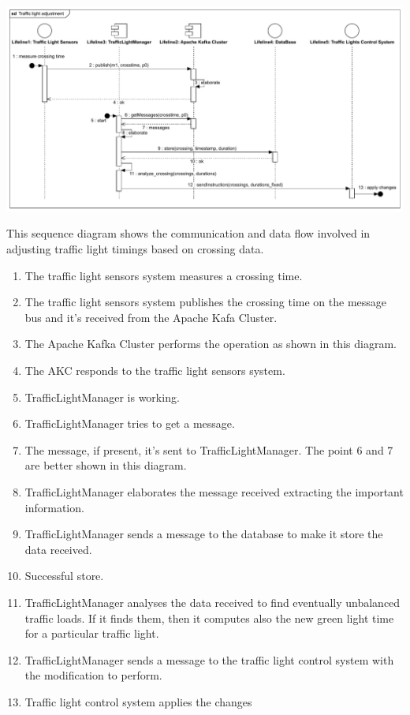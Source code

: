 \documentclass[12pt, a4paper, twoside, openright]{report}
\begin{document}
\includegraphics[width=\linewidth]{images/svg/traffic_light_adjustment.pdf}

This sequence diagram shows the communication and data flow involved in
adjusting traffic light timings based on crossing data.

\begin{enumerate}
\item
  The traffic light sensors system measures a crossing time.
\item
  The traffic light sensors system publishes the crossing time on the
  message bus and it's received from the Apache Kafa Cluster.
\item
  The Apache Kafka Cluster performs the operation as shown in this
  diagram.
\item
  The AKC responds to the traffic light sensors system.
\item
  TrafficLightManager is working.
\item
  TrafficLightManager tries to get a message.
\item
  The message, if present, it's sent to TrafficLightManager. The point 6
  and 7 are better shown in this diagram.
\item
  TrafficLightManager elaborates the message received extracting the
  important information.
\item
  TrafficLightManager sends a message to the database to make it store
  the data received.
\item
  Successful store.
\item
  TrafficLightManager analyses the data received to find eventually
  unbalanced traffic loads. If it finds them, then it computes also the
  new green light time for a particular traffic light.
\item
  TrafficLightManager sends a message to the traffic light control
  system with the modification to perform.
\item
  Traffic light control system applies the changes
\end{enumerate}
\end{document}

